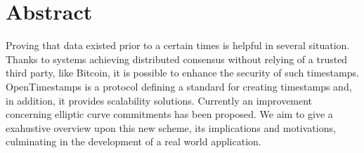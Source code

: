 \chapter{Abstract}
\label{chpr:abstract}

Proving that data existed prior to a certain times is helpful in several situation.
Thanks to systems achieving distributed consensus without relying of a trusted third party, like Bitcoin, it is possible to enhance the security of such timestamps.
OpenTimestamps is a protocol defining a standard for creating timestamps and, in addition, it provides scalability solutions.
Currently an improvement concerning elliptic curve commitments has been proposed. 
We aim to give a exahustive overview upon this new scheme, its implications and motivations, culminating in the development of a real world application.

